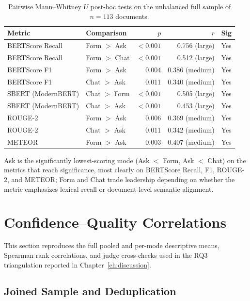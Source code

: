 \begin{table}[H]
\centering
\caption{Pairwise Mann--Whitney $U$ post-hoc tests on the
unbalanced full sample of $n = 113$ documents.}
\label{tab:app-nlp-mwu}
\small
\begin{tabular}{@{}l l r r l@{}}
\toprule
Metric & Comparison & $p$ & $r$ & Sig \\
\midrule
BERTScore Recall & Form $>$ Ask  & $<0.001$ & 0.756 (large)  & Yes \\
BERTScore Recall & Form $>$ Chat & $<0.001$ & 0.512 (large)  & Yes \\
BERTScore F1     & Form $>$ Ask  & 0.004    & 0.386 (medium) & Yes \\
BERTScore F1     & Chat $>$ Ask  & 0.011    & 0.340 (medium) & Yes \\
SBERT (ModernBERT) & Chat $>$ Form & $<0.001$ & 0.505 (large)  & Yes \\
SBERT (ModernBERT) & Chat $>$ Ask  & $<0.001$ & 0.453 (large)  & Yes \\
ROUGE-2          & Form $>$ Ask  & 0.006    & 0.369 (medium) & Yes \\
ROUGE-2          & Chat $>$ Ask  & 0.011    & 0.342 (medium) & Yes \\
METEOR           & Form $>$ Ask  & 0.003    & 0.407 (medium) & Yes \\
\bottomrule
\end{tabular}
\end{table}

Ask is the significantly lowest-scoring mode (Ask $<$ Form, Ask
$<$ Chat) on the metrics that reach significance, most clearly on
BERTScore Recall, F1, ROUGE-2, and METEOR; Form and Chat trade
leadership depending on whether the metric emphasizes lexical
recall or document-level semantic alignment.

\section{Confidence--Quality Correlations}
\label{app:inf-corr}

This section reproduces the full pooled and per-mode descriptive
means, Spearman rank correlations, and judge cross-checks used in
the RQ3 triangulation reported in Chapter~\ref{ch:discussion}.

\subsection{Joined Sample and Deduplication}
\label{app:inf-corr-sample}

